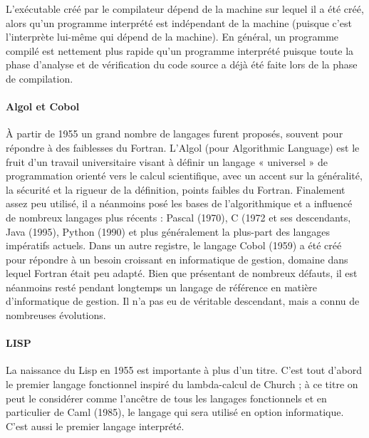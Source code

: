 L’exécutable créé par le compilateur dépend de la machine sur lequel il a été créé, alors qu’un programme
interprété est indépendant de la machine (puisque c’est l’interprète lui-même qui dépend de la machine). En
général, un programme compilé est nettement plus rapide qu’un programme interprété puisque toute la phase
d’analyse et de vérification du code source a déjà été faite lors de la phase de compilation.
\paragraph{Algol et Cobol}
À partir de 1955 un grand nombre de langages furent proposés, souvent pour répondre à des faiblesses du
Fortran. L’Algol (pour Algorithmic Language) est le fruit d’un travail universitaire visant à définir un
langage « universel » de programmation orienté vers le calcul scientifique, avec un accent sur la généralité, la
sécurité et la rigueur de la définition, points faibles du Fortran. Finalement assez peu utilisé, il a néanmoins
posé les bases de l’algorithmique et a influencé de nombreux langages plus récents : Pascal (1970), C (1972 et
ses descendants, Java (1995), Python (1990) et plus généralement la plus-part des langages impératifs actuels.
Dans un autre registre, le langage Cobol (1959) a été créé pour répondre à un besoin croissant en informatique
de gestion, domaine dans lequel Fortran était peu adapté. Bien que présentant de nombreux défauts, il est
néanmoins resté pendant longtemps un langage de référence en matière d’informatique de gestion. Il n’a pas eu
de véritable descendant, mais a connu de nombreuses évolutions.

\paragraph{LISP}La naissance du Lisp en 1955 est importante à plus d’un titre. C’est tout d’abord le premier langage fonctionnel
inspiré du lambda-calcul de Church ; à ce titre on peut le considérer comme l’ancêtre de tous les langages
fonctionnels et en particulier de Caml (1985), le langage qui sera utilisé en option informatique. C’est aussi le
premier langage interprété.
